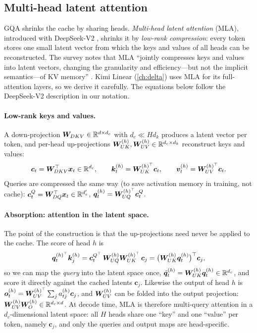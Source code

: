 \subsection{Multi-head latent attention}\label{sec:c01-mla}

GQA shrinks the cache by sharing heads. \emph{Multi-head latent attention} (MLA), introduced
with DeepSeek-V2 \citep{deepseek2024v2}, shrinks it by \emph{low-rank compression}: every
token stores one small latent vector from which the keys and values of all heads can be
reconstructed. The survey notes that MLA ``jointly compresses keys and values into latent
vectors, changing the granularity and efficiency---but not the implicit semantics---of KV
memory'' \citep{zhoubian2026memory}. Kimi Linear (\cref{ch:delta}) uses MLA for its
full-attention layers, so we derive it carefully. The equations below follow the DeepSeek-V2
description in our notation.

\paragraph{Low-rank keys and values.} A down-projection $\bm{W}_{DKV} \in \mathbb{R}^{d\times d_c}$ with
$d_c \ll H d_k$ produces a latent vector per token, and per-head up-projections
$\bm{W}_{UK}^{(h)}, \bm{W}_{UV}^{(h)} \in \mathbb{R}^{d_c \times d_k}$ reconstruct keys and values:
\begin{equation}\label{eq:c01-mla-kv}
  \bm{c}_t = \bm{W}_{DKV}^{\top}\bm{x}_t \in \mathbb{R}^{d_c},\qquad
  \bm{k}_t^{(h)} = \bm{W}_{UK}^{(h)^{\top}}\bm{c}_t,\qquad
  \bm{v}_t^{(h)} = \bm{W}_{UV}^{(h)^{\top}}\bm{c}_t .
\end{equation}
Queries are compressed the same way (to save activation memory in training, not cache):
$\bm{c}^{Q}_t = \bm{W}_{DQ}^{\top}\bm{x}_t \in \mathbb{R}^{d_c'}$, $\bm{q}_t^{(h)} = \bm{W}_{UQ}^{(h)^{\top}}\bm{c}^Q_t$.

\paragraph{Absorption: attention in the latent space.} The point of the construction is that
the up-projections need never be applied to the cache. The score of head $h$ is
\begin{equation}\label{eq:c01-mla-absorb}
  \bm{q}_t^{(h)^{\top}}\bm{k}_j^{(h)}
  = \bm{c}^{Q^{\top}}_t\,\bm{W}_{UQ}^{(h)}\bm{W}_{UK}^{(h)^{\top}}\,\bm{c}_j
  = \bigl(\bm{W}_{UK}^{(h)}\bm{q}_t^{(h)}\bigr)^{\top}\bm{c}_j ,
\end{equation}
so we can map the \emph{query} into the latent space once,
$\tilde{\bm{q}}_t^{(h)} = \bm{W}_{UK}^{(h)}\bm{q}_t^{(h)} \in \mathbb{R}^{d_c}$, and score it directly against
the cached latents $\bm{c}_j$. Likewise the output of head $h$ is
$\bm{o}_t^{(h)} = \bm{W}_{UV}^{(h)^{\top}}\sum_j a^{(h)}_{tj}\bm{c}_j$, and $\bm{W}_{UV}^{(h)}$ can be
folded into the output projection: $\bm{W}_{UV}^{(h)}\bm{W}_O^{(h)} \in \mathbb{R}^{d_c \times d}$. At
decode time, MLA is therefore multi-query attention in a $d_c$-dimensional latent space:
all $H$ heads share one ``key'' and one ``value'' per token, namely $\bm{c}_j$, and only the
queries and output maps are head-specific.

